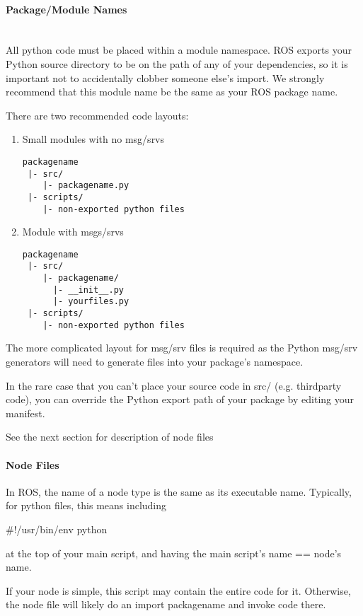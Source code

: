 \paragraph{Package/Module Names}~\\
All python code must be placed within a module namespace. 
ROS exports your Python source directory to be on the path of any of your dependencies, so it is important not to accidentally clobber someone else's import. 
We strongly recommend that this module name be the same as your ROS package name.

There are two recommended code layouts:
\begin{enumerate}
\item Small modules with no msg/srvs
\begin{verbatim}
packagename
 |- src/
    |- packagename.py
 |- scripts/
    |- non-exported python files
\end{verbatim}

\item Module with msgs/srvs
\begin{verbatim}
packagename
 |- src/
    |- packagename/
      |- __init__.py
      |- yourfiles.py
 |- scripts/
    |- non-exported python files
\end{verbatim}
\end{enumerate}

The more complicated layout for msg/srv files is required as the Python msg/srv generators will need to generate files into your package's namespace.

In the rare case that you can't place your source code in src/ (e.g. thirdparty code), you can override the Python export path of your package by editing your manifest.

See the next section for description of node files

\paragraph{Node Files}
In ROS, the name of a node type is the same as its executable name. 
Typically, for python files, this means including \begin{tt}\#!/usr/bin/env python \end{tt}at the top of your main script, and having the main script's name == node's name.

If your node is simple, this script may contain the entire code for it. Otherwise, the node file will likely do an import packagename and invoke code there.

